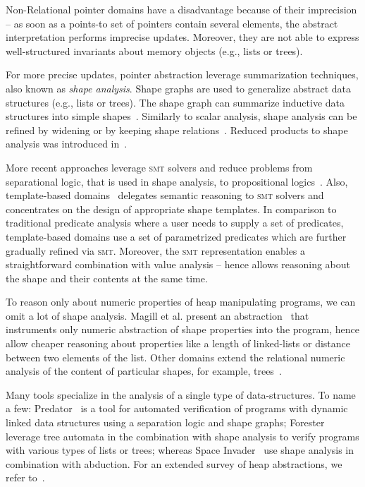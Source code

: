 Non-Relational pointer domains have a disadvantage because of their imprecision
-- as soon as a points-to set of pointers contain several elements, the
abstract interpretation performs imprecise updates. Moreover, they are not able
to express well-structured invariants about memory objects (e.g., lists or trees).

For more precise updates, pointer abstraction leverage summarization
techniques, also known as \emph{shape analysis}. Shape graphs are used to
generalize abstract data structures (e.g., lists or trees). The shape graph can
summarize inductive data structures into simple shapes~\cite{Distefano2006}.
Similarly to scalar analysis, shape analysis can be refined by widening or by
keeping shape relations~\cite{Chang2008}.  Reduced products to shape analysis
was introduced in~\cite{Toubhans2013}.

More recent approaches leverage \textsc{smt} solvers and reduce problems from
separational logic, that is used in shape analysis, to propositional
logics~\cite{Piskac2013, Itzhaky2014, Itzhaky2014b}.  Also, template-based
domains~\cite{Malik2018} delegates semantic reasoning to \textsc{smt} solvers
and concentrates on the design of appropriate shape templates.  In comparison
to traditional predicate analysis where a user needs to supply a set of
predicates, template-based domains use a set of parametrized predicates which
are further gradually refined via \textsc{smt}.  Moreover, the \textsc{smt}
representation enables a straightforward combination with value analysis --
hence allows reasoning about the shape and their contents at the same time.

To reason only about numeric properties of heap manipulating programs, we can
omit a lot of shape analysis. Magill et al. present an
abstraction~\cite{Magill2010} that instruments only numeric abstraction of
shape properties into the program, hence allow cheaper reasoning about
properties like a length of linked-lists or distance between two elements of
the list. Other domains extend the relational numeric analysis of the content
of particular shapes, for example, trees~\cite{Journault2019}.

Many tools specialize in the analysis of a single type of data-structures. To
name a few: Predator~\cite{Dudka2012} is a tool for automated verification of programs with
dynamic linked data structures using a separation logic and shape
graphs; Forester~\cite{Holik2015} leverage tree automata in the combination
with shape analysis to verify programs with various types of lists or
trees; whereas Space Invader~\cite{Yang2008} use shape
analysis in combination with abduction. For an extended survey of heap
abstractions, we refer to~\cite{Kanvar2016}.

